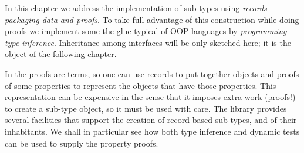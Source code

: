 

In this chapter we address the implementation of sub-types using
\emph{records packaging data and proofs}.  To take
full advantage of this construction while doing proofs we
implement some the glue typical of OOP languages
by \emph{programming type inference}.
Inheritance among interfaces will be only sketched here;
it is the object of the following chapter.

In the \mcbCIC{} proofs are terms, so one can use records to put
together objects and proofs of some properties to represent the
objects that have those properties.  This representation can be
expensive in the sense that it imposes extra work (proofs!) to create
a sub-type object, so it must be used with care.  The \mcbMC{} library
provides several facilities that support the creation of record-based
sub-types, and of their inhabitants.
We shall in particular see how both type inference and dynamic tests
can be used to supply the property proofs.

